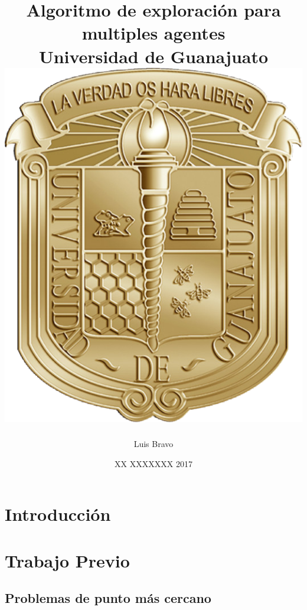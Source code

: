 \documentclass[12pt,a4paper]{report}
\title{
	{Algoritmo de exploración para multiples agentes}\\
	{\large Universidad de Guanajuato}\\
	{\includegraphics{escudo.png}}
}
\author{Luis Bravo}
\date{XX XXXXXXX 2017}
\begin{document}
 
\maketitle








\chapter{Introducción}


\chapter{Trabajo Previo}
\section{Problemas de punto más cercano}

\tableofcontents


%
\end{document}
